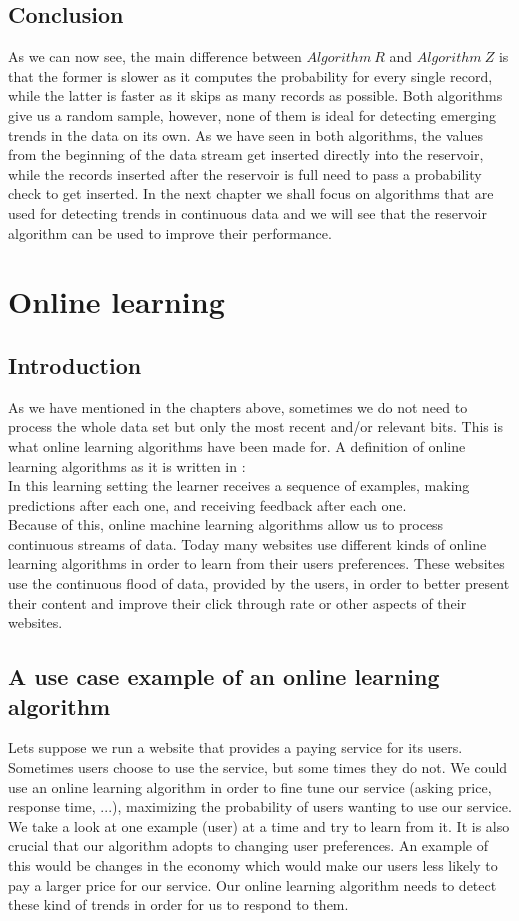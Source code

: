 \documentclass[journal]{IEEEtran/IEEEtran}
\begin{document}
\subsection{Conclusion}
As we can now see, the main difference between $Algorithm\ R$ and $Algorithm\ Z$ is that the former is slower as it computes the probability for every single record, while the latter is faster as it skips as many records as possible. Both algorithms give us a random sample, however, none of them is ideal for detecting emerging trends in the data on its own. As we have seen in both algorithms, the values from the beginning of the data stream get inserted directly into the reservoir, while the records inserted after the reservoir is full need to pass a probability check to get inserted. In the next chapter we shall focus on algorithms that are used for detecting trends in continuous data and we will see that the reservoir algorithm can be used to improve their performance.
\section{Online learning}
\subsection{Introduction}
As we have mentioned in the chapters above, sometimes we do not need to process the whole data set but only the most recent and/or relevant bits. This is what online learning algorithms have been made for. A definition of online learning algorithms as it is written in \cite{learning}:\\

In this learning setting the learner receives a sequence of examples, making predictions after each one, and receiving feedback after each one.\\ 

Because of this, online machine learning algorithms allow us to process continuous streams of data. Today many websites use different kinds of online learning algorithms in order to learn from their users preferences. These websites use the continuous flood of data, provided by the users, in order to better present their content and improve their click through rate or other aspects of their websites. 
\subsection{A use case example of an online learning algorithm}
Lets suppose we run a website that provides a paying service for its users. Sometimes users choose to use the service, but some times they do not. We could use an online learning algorithm in order to fine tune our service (asking price, response time, ...), maximizing the probability of users wanting to use our service. We take a look at one example (user) at a time and try to learn from it. It is also crucial that our algorithm adopts to changing user preferences. An example of this would be changes in the economy which would make our users less likely to pay a larger price for our service. Our online learning algorithm needs to detect these kind of trends in order for us to respond to them. 
\end{document}
